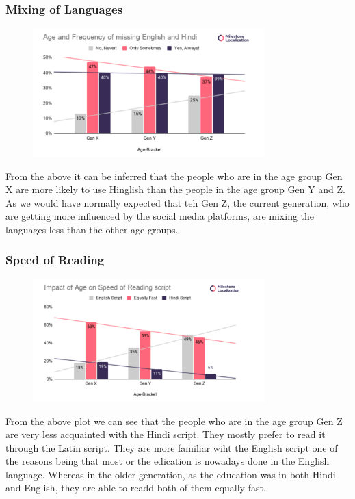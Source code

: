\documentclass{article}
\begin{document}
\subsubsection{Mixing of Languages}

\begin{figure}[H]
    \centering
    \includegraphics[width=0.8\textwidth]{plots/age_mixing_language.png}
\end{figure}
From the above it can be inferred that the people who are in the age group Gen X are more likely to use Hinglish than the people in the age group Gen Y and Z. As we would have normally expected that teh Gen Z, the current generation, who are getting more influenced by the social media platforms, are mixing the languages less than the other age groups. 

\subsubsection{Speed of Reading}

\begin{figure}[H]
    \centering
    \includegraphics[width=0.8\textwidth]{plots/age_faster_read.png}
\end{figure}

From the above plot we can see that the people who are in the age group Gen Z are very less acquainted with the Hindi script. They mostly prefer to read it through the Latin script. They are more familiar wiht the English script one of the reasons being that most or the edication is nowadays done in the English language. Whereas in the older generation, as the education was in both Hindi and English, they are able to readd both of them equally fast. 
\end{document}

